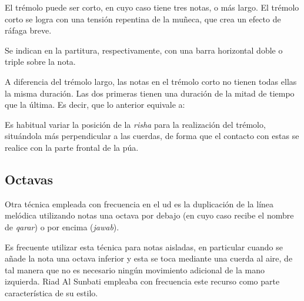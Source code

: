 El trémolo puede ser corto, en cuyo caso tiene tres notas, o más largo. El trémolo corto se logra con una tensión repentina de la muñeca, que crea un efecto de ráfaga breve.

Se indican en la partitura, respectivamente, con una barra horizontal doble o triple sobre la nota.


\begin{center}
\end{center}


A diferencia del trémolo largo, las notas en el trémolo corto no tienen todas ellas la misma duración. Las dos primeras tienen una duración de la mitad de tiempo que la última. Es decir, que lo anterior equivale a:


\begin{center}
\end{center}


Es habitual variar la posición de la \emph{risha} para la realización del trémolo, situándola más perpendicular a las cuerdas, de forma que el contacto con estas se realice con la parte frontal de la púa.


\subsection{Octavas}
\label{octavas}

Otra técnica empleada con frecuencia en el ud es la duplicación de la línea melódica utilizando notas una octava por debajo (en cuyo caso recibe el nombre de \emph{qarar}) o por encima (\emph{jawab}).

Es frecuente utilizar esta técnica para notas aisladas, en particular cuando se añade la nota una octava inferior y esta se toca mediante una cuerda al aire, de tal manera que no es necesario ningún movimiento adicional de la mano izquierda. Riad Al Sunbati empleaba con frecuencia este recurso como parte característica de su estilo.


